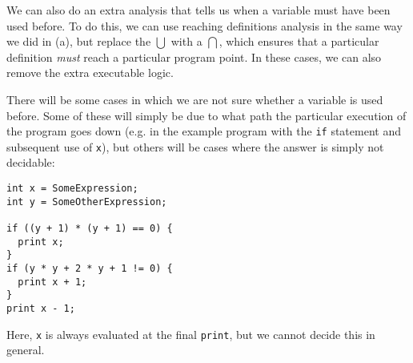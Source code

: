 \begin{enumerate}[label=(\alph*)]
    We can also do an extra analysis that tells us when a variable must have been used before. To do this, we can use reaching definitions analysis in the same way we did in (a), but replace the $\bigcup$ with a $\bigcap$, which ensures that a particular definition \textit{must} reach a particular program point. In these cases, we can also remove the extra executable logic.

    There will be some cases in which we are not sure whether a variable is used before. Some of these will simply be due to what path the particular execution of the program goes down (e.g. in the example program with the \texttt{if} statement and subsequent use of \texttt{x}), but others will be cases where the answer is simply not decidable:

\begin{verbatim}
int x = SomeExpression;
int y = SomeOtherExpression;

if ((y + 1) * (y + 1) == 0) {
  print x;
}
if (y * y + 2 * y + 1 != 0) {
  print x + 1;
}
print x - 1;
\end{verbatim}

Here,  \texttt{x} is always evaluated at the final \texttt{print}, but we cannot decide this in general.
\end{enumerate}

